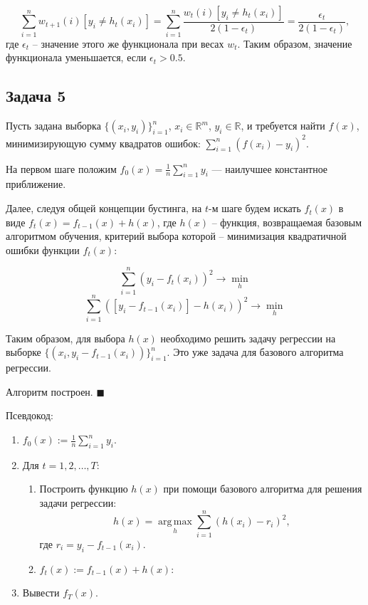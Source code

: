 \documentclass[a4paper, 12pt, onepage]{article}
\begin{document}
$$
\sum_{i=1}^n w_{t+1}(i) [y_i \ne h_t(x_i)] =
\sum_{i=1}^n \frac{  w_{t}(i) [y_i \ne h_t(x_i)]}{2(1 - \epsilon_t)} =
\frac{ \epsilon_t }{2(1 - \epsilon_t)},
$$
где $\epsilon_t$ -- значение этого же функционала при весах $w_t$.
Таким образом, значение функционала уменьшается, если $\epsilon_t > 0.5$.

\newpage
\subsection*{Задача 5}

Пусть задана выборка $\{ (x_i, y_i) \}_{i=1}^n$, $x_i \in \mathbb{R}^m$, $y_i \in \mathbb{R}$,
и требуется найти $f(x)$, минимизирующую сумму квадратов ошибок:
$ \sum_{i=1}^n (f(x_i) - y_i)^2$.

На первом шаге положим $f_0(x) = \frac1n \sum_{i=1}^n y_i$ --- наилучшее константное приближение.

Далее, следуя общей концепции бустинга, на $t$-м шаге будем искать $f_t(x)$
в виде $f_t(x) = f_{t-1}(x) + h(x)$, где $h(x)$ -- функция, возвращаемая базовым
алгоритмом обучения, критерий выбора которой -- минимизация квадратичной ошибки функции $f_t(x)$:

$$ \sum_{i=1}^n (y_i - f_t(x_i))^2 \to \min_h $$
$$ \sum_{i=1}^n ([y_i - f_{t-1}(x_i)] - h(x_i))^2 \to \min_h $$

Таким образом, для выбора $h(x)$ необходимо решить задачу регрессии на
выборке $ \{ (x_i, y_i - f_{t-1}(x_i)) \}_{i=1}^n$. Это уже задача для базового алгоритма регрессии.

Алгоритм построен. \hfill $\blacksquare$

\bigskip
\begin{framed}
Псевдокод:
\begin{enumerate}
  \item $f_0(x) := \frac1n \sum_{i=1}^n y_i$.
  \item Для $t = 1, 2, \ldots, T$:
    \begin{enumerate}
      \item Построить функцию $h(x)$ при помощи базового алгоритма для решения задачи регрессии:
        $$ h(x) = \underset{h}{\operatorname{arg\,max}} \sum_{i=1}^n (h(x_i) - r_i)^2,$$
	где $r_i = y_i - f_{t-1}(x_i)$.
      \item $f_t(x) := f_{t-1}(x) + h(x)$:
    \end{enumerate}
  \item Вывести $f_T(x)$.
\end{enumerate}
\end{framed}
\end{document}
